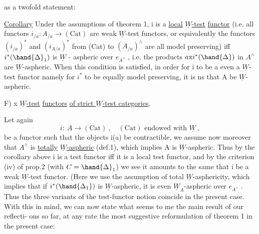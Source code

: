 
as a twofold statement:

\uline{Corollary} Under the assumptions of theorem 1, i is a \uline{local} \uline{$\underline{W}$-test}
\uline{functor} (i.e. all functors $i_{/a} : A_{/a}\to(\mathrm{Cat})$ are weak $\underline{W}$-test functors,
or equivalently the functors $(i_{/a})^*$ and $(i_{A/a})^*$ from (Cat) to $(A_{/a})^\wedge$
are all model preserving) iff $i^*(\hand{\Delta}_1)$ is $\underline{W}$ - aspheric over $e_{A^\wedge}$ , i.e.
the products $a\mathrm{x}i^*(\hand{\Delta})$ in $A^\wedge$  are $\underline{W}$-aspheric.  When this condition is
satisfied, in order for i to be a even a $\underline{W}$-test functor namely for $i^*$ 
to be equally model preserving, it is ns that A be $\underline{W}$-aspheric.

 F) \uline{}x \uline{$\underline{W}$-test} \uline{functors} \uline{of strict $\underline{W}$-test categories}.

Let  again
\[ i:\ A\longrightarrow(\mathrm{Cat}) \ ,\quad (\mathrm{Cat}) \text{ endowed with } \underline{W} \ , \]
be a functor such that the objects i(a) be contractible, we assume now
moreover that $A^\wedge$ is \uline{totally} \uline{$\underline{W}$-aspheric} (def.1), which implies A is
$\underline{W}$-aspheric. Thus by the corollary above i is a test functor iff it is
a local test functor, and by the criterion (iv) of prop.2 (with $C=\hand{\Delta}_1$)
we see it amounts to the same that i be a weak $\underline{W}$-test functor. (Here we
use the assumption of total $\underline{W}$-asphericity, which implies that if $i^*(\hand{\Delta_1})$
is $\underline{W}$-aspheric, it is even $\underline{W}_A$-aspheric over $e_{A^\wedge}$ .\hand{)} Thus the three variants
of the test-functor notion coincide in the present case. With this in
mind, we can now state what seems to me the main result of our reflecti-%
ons so far, at any rate the most suggestive reformulation of theorem 1
in the present case:

